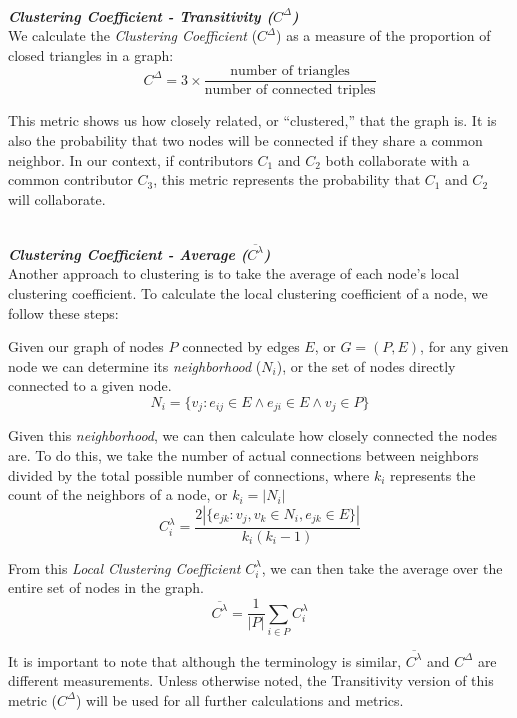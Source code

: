 \documentclass{proc}
\begin{document}
\noindent\\\textit{\textbf{Clustering Coefficient - Transitivity ($C^\Delta$)}}\\
We calculate the \textit{Clustering Coefficient} ($C^\Delta$) as a measure of the proportion of closed triangles in a graph\cite{newman2003structure}:
\[C^\Delta = 3 \times \frac{\text{number of triangles}}
                    {\text{number of connected triples}}\]

This metric shows us how closely related, or ``clustered,'' that the graph is. It is also the probability that two nodes will be connected if they share a common neighbor\cite{newman2003properties}. In our context, if contributors $C_1$ and $C_2$ both collaborate with a common contributor $C_3$, this metric represents the probability that $C_1$ and $C_2$ will collaborate.

\noindent\\\textit{\textbf{Clustering Coefficient - Average ($\overline{C^{\lambda}}$)}}\\
Another approach to clustering is to take the average of each node's local clustering coefficient\cite{watts1998collective}. To calculate the local clustering coefficient of a node, we follow these steps:

Given our graph of nodes $P$ connected by edges $E$, or ${G=(P,E)}$, for any given node we can determine its \textit{neighborhood} ($N_i$), or the set of nodes directly connected to a given node.
\[ N_i = \{v_j : e_{ij} \in E \wedge e_{ji} \in E \wedge v_j \in P\} \]

Given this \textit{neighborhood}, we can then calculate how closely connected the nodes are. To do this, we take the number of actual connections between neighbors divided by the total possible number of connections, where $k_i$ represents the count of the neighbors of a node, or {$k_i = |N_i|$}
\[ C^{\lambda}_i = \frac{2|\{e_{jk}: v_j,v_k \in N_i, e_{jk} \in E\}|}{k_i(k_i-1)} \]

From this \textit{Local Clustering Coefficient} $C^{\lambda}_i$, we can then take the average over the entire set of nodes in the graph.
\[ \overline{C^\lambda} = \frac{1}{|P|}\sum_{i \in P}C^{\lambda}_i \]

It is important to note that although the terminology is similar\cite{uzzi2005collaboration}, $\overline{C^\lambda}$ and $C^\Delta$ are different measurements. Unless otherwise noted, the Transitivity version of this metric ($C^\Delta$) will be used for all further calculations and metrics.
\end{document}
